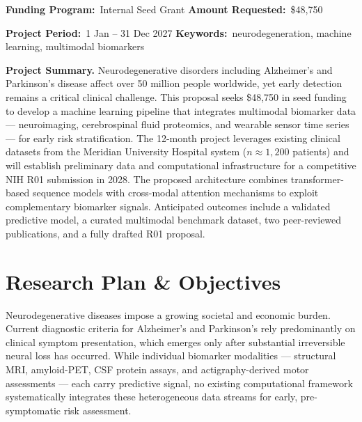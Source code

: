 \documentclass[10pt]{article}
\begin{document}
\par

\vspace{4pt}

\begin{tcolorbox}[colback=navy!4, colframe=navy!20, boxrule=0.4pt, arc=3pt, left=8pt, right=8pt, top=5pt, bottom=5pt]
  \footnotesize
  \textbf{Funding Program:}\ Internal Seed Grant \hspace{1.4cm} \textbf{Amount Requested:}\ \$48,750

  \textbf{Project Period:}\ 1 Jan -- 31 Dec 2027 \hspace{2cm} \textbf{Keywords:}\ neurodegeneration, machine learning, multimodal biomarkers
\end{tcolorbox}

\vspace{4pt}

\begin{abstractbox}
  \small
  \textbf{\color{navy}Project Summary.} Neurodegenerative disorders including Alzheimer's and Parkinson's disease affect over 50 million people worldwide, yet early detection remains a critical clinical challenge. This proposal seeks \$48,750 in seed funding to develop a machine learning pipeline that integrates multimodal biomarker data --- neuroimaging, cerebrospinal fluid proteomics, and wearable sensor time series --- for early risk stratification. The 12-month project leverages existing clinical datasets from the Meridian University Hospital system ($n \approx 1{,}200$ patients) and will establish preliminary data and computational infrastructure for a competitive NIH R01 submission in 2028. The proposed architecture combines transformer-based sequence models with cross-modal attention mechanisms to exploit complementary biomarker signals. Anticipated outcomes include a validated predictive model, a curated multimodal benchmark dataset, two peer-reviewed publications, and a fully drafted R01 proposal.
\end{abstractbox}

\section{Research Plan \& Objectives}

Neurodegenerative diseases impose a growing societal and economic burden. Current diagnostic criteria for Alzheimer's and Parkinson's rely predominantly on clinical symptom presentation, which emerges only after substantial irreversible neural loss has occurred. While individual biomarker modalities --- structural MRI, amyloid-PET, CSF protein assays, and actigraphy-derived motor assessments --- each carry predictive signal, no existing computational framework systematically integrates these heterogeneous data streams for early, pre-symptomatic risk assessment.
\end{document}
